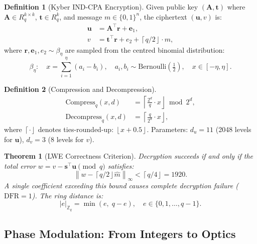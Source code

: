 \documentclass[11pt, a4paper]{article}
\theoremstyle{definition}
\newtheorem{definition}{Definition}[section]
\theoremstyle{plain}
\newtheorem{theorem}{Theorem}[section]
\newcommand{\Zq}{\mathbb{Z}_q}
\newcommand{\norm}[1]{\left\|#1\right\|}
\newcommand{\ceil}[1]{\left\lceil#1\right\rfloor}
\newcommand{\floor}[1]{\left\lfloor#1\right\rfloor}
\begin{document}
\begin{definition}[Kyber IND-CPA Encryption]
\label{def:kyber}
Given public key $(\mathbf{A}, \mathbf{t})$ where
$\mathbf{A} \in R_q^{k \times k}$, $\mathbf{t} \in R_q^k$, and message
$m \in \{0,1\}^n$, the ciphertext $(\mathbf{u}, v)$ is:
\begin{align}
  \mathbf{u} &= \mathbf{A}^\top \mathbf{r} + \mathbf{e}_1,
  \label{eq:kyber_u}\\
  v &= \mathbf{t}^\top \mathbf{r} + e_2 + \ceil{q/2} \cdot m,
  \label{eq:kyber_v}
\end{align}
where $\mathbf{r}, \mathbf{e}_1, e_2 \sim \beta_\eta$ are sampled from the
centred binomial distribution:
\begin{equation}
  \beta_\eta: \quad x = \sum_{i=1}^{\eta}(a_i - b_i), \quad
  a_i, b_i \sim \mathrm{Bernoulli}(\tfrac{1}{2}), \quad
  x \in [-\eta, \eta].
  \label{eq:cbd}
\end{equation}
\end{definition}

\begin{definition}[Compression and Decompression]
\label{def:compress}
\begin{align}
  \mathrm{Compress}_q(x, d) &= \ceil{\frac{2^d}{q} \cdot x}
  \bmod 2^d, \label{eq:compress}\\
  \mathrm{Decompress}_q(x, d) &= \ceil{\frac{q}{2^d} \cdot x},
  \label{eq:decompress}
\end{align}
where $\ceil{\cdot}$ denotes ties-rounded-up: $\floor{x + 0.5}$.
Parameters: $d_u = 11$ (2048 levels for $\mathbf{u}$),
$d_v = 3$ (8 levels for $v$).
\end{definition}

\begin{theorem}[LWE Correctness Criterion]
\label{thm:lwe}
Decryption succeeds if and only if the total error
$w = v - \mathbf{s}^\top\mathbf{u} \pmod{q}$ satisfies:
\begin{equation}
  \norm{w - \ceil{q/2}\hat{m}}_\infty < \ceil{q/4} = 1920.
  \label{eq:lwe_threshold}
\end{equation}
A single coefficient exceeding this bound causes complete decryption failure
($\mathrm{DFR} = 1$). The ring distance is:
\begin{equation}
  |e|_{\Zq} = \min(e, \; q - e), \quad e \in \{0, 1, \ldots, q-1\}.
  \label{eq:ring_distance}
\end{equation}
\end{theorem}


\subsection{Phase Modulation: From Integers to Optics}
\label{sec:phase_mod}
\end{document}
